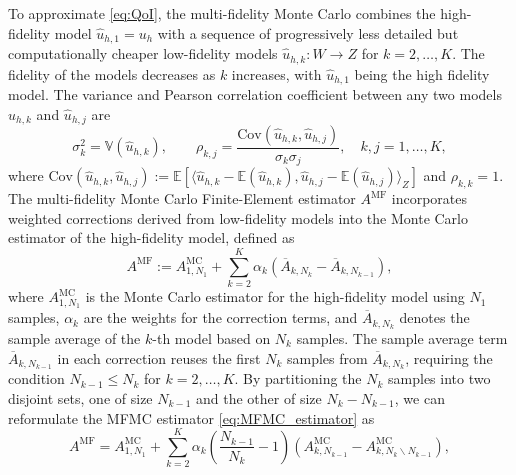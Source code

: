 To approximate \eqref{eq:QoI}, the multi-fidelity Monte Carlo combines the high-fidelity model $\widehat u_{h,1}=u_{h}$ with a sequence of progressively less detailed but computationally cheaper low-fidelity models $\widehat u_{h,k}: W \rightarrow Z$ for $k=2,\ldots,K$. The fidelity of the models decreases as $k$ increases, with $\widehat u_{h,1}$ being the high fidelity model. The variance and Pearson correlation coefficient between any two models $\widehat u_{h,k}$ and $\widehat u_{h,j}$ are
%
\begin{equation*}
    \sigma_k^2 = \mathbb{V}\left(\widehat u_{h,k}\right),\qquad \rho_{k,j} = \frac{\text{Cov}\left(\widehat u_{h,k},\widehat u_{h,j}\right)}{\sigma_k\sigma_j}, \quad k,j=1,\dots, K,
\end{equation*}
%
where $\text{Cov}(\widehat u_{h,k},\widehat u_{h,j}) := \mathbb{E}[\langle \widehat u_{h,k} - \mathbb{E}(\widehat u_{h,k}), \widehat u_{h,j} - \mathbb{E}(\widehat u_{h,j})\rangle_Z]$ and $\rho_{k,k}=1$.
The multi-fidelity Monte Carlo Finite-Element estimator $A^{\text{MF}}$ incorporates weighted corrections derived from low-fidelity models into the  Monte Carlo estimator of the high-fidelity model, defined as
%
\begin{equation}\label{eq:MFMC_estimator}
    A^{\text{MF}} := A^{\text{MC}}_{1,N_1} + \sum_{k=2}^K \alpha_k\left(\overline{A}_{k,N_k} - \overline{A}_{k,N_{k-1}} \right),
\end{equation}
%
where $A^{\text{MC}}_{1,N_1} $ is the Monte Carlo estimator for the high-fidelity model using $N_1$ samples, $\alpha_k$ are the weights for the correction terms, and $\overline{A}_{k,N_k}$ denotes the sample average of the $k$-th model based on $N_k$ samples. The sample average term $\overline{A}_{k,N_{k-1}}$ in each correction reuses the first $N_{k}$ samples from $\overline{A}_{k,N_{k}}$, requiring the condition $N_{k-1}\le N_k$ for $k=2,\ldots, K$. By partitioning the $N_k$ samples into two disjoint sets, one of size $N_{k-1}$ and the other of size $N_k - N_{k-1}$, we can reformulate the MFMC estimator \eqref{eq:MFMC_estimator} as
%
\begin{equation}\label{eq:MFMC_estimator_independent}
    A^{\text{MF}} = A^{\text{MC}}_{1,N_1} +  \sum_{k=2}^K \alpha_k\left(\frac{N_{k-1}}{N_{k}}-1\right)\left(A_{k,N_{k-1}}^{\text{MC}}- A_{k,N_k\backslash N_{k-1}}^{\text{MC}}\right),
\end{equation}
